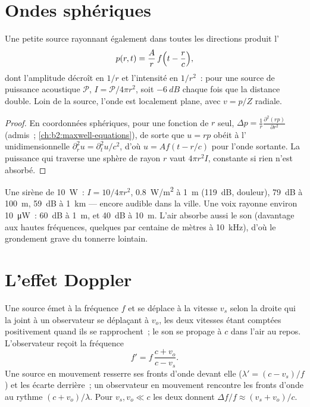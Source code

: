 \section{Ondes sphériques}

\begin{proposition}\label{prop:b2:sound-waves:spherical}
Une petite source rayonnant également dans toutes les directions produit
l'
\[
p(r, t) = \frac{A}{r}\,f\Bigl(t - \frac rc\Bigr) ,
\]
dont l'amplitude décroît en $1/r$ et l'intensité en $1/r^2$~:
pour une source de puissance acoustique $\mathcal P$, $I = \mathcal P/4\pi r^2$, soit
$-\qty{6}{dB}$ chaque fois que la distance double. Loin de la source, l'onde
est localement plane, avec $v = p/Z$ radiale.
\end{proposition}

\begin{proof}
En coordonnées sphériques, pour une fonction de $r$ seul, $\Delta p =
\frac1r\frac{\partial^2(rp)}{\partial r^2}$ (admis~; \cref{ch:b2:maxwell-equations}),
de sorte que $u = rp$ obéit à l' unidimensionnelle $\partial_r^2u = \partial_t^2u/c^2$,
d'où $u = Af(t - r/c)$ pour l'onde sortante. La puissance qui traverse une
sphère de rayon $r$ vaut $4\pi r^2I$, constante si rien n'est absorbé.
\end{proof}

\begin{example}\label{ex:b2:sound-waves:siren}
Une sirène de \qty{10}{W}~: $I = 10/4\pi r^2$, \qty{0.8}{W/m^2} à \qty{1}{m} (\qty{119}{dB},
douleur), \qty{79}{dB} à \qty{100}{m}, \qty{59}{dB} à \qty{1}{km} --- encore audible dans
la ville. Une voix rayonne environ \qty{10}{\micro W}~: \qty{60}{dB} à \qty{1}{m},
et \qty{40}{dB} à \qty{10}{m}. L'air absorbe aussi le son (davantage aux hautes
fréquences, quelques  par centaine de mètres à \qty{10}{kHz}), d'où le
grondement grave du tonnerre lointain.
\end{example}

\section{L'effet Doppler}

\begin{theorem}\label{thm:b2:sound-waves:doppler}
Une source émet à la fréquence $f$ et se déplace à la vitesse $v_s$ selon la droite
qui la joint à un observateur se déplaçant à $v_o$, les deux vitesses étant comptées
positivement quand ils se rapprochent~; le son se propage à $c$ dans
l'air au repos. L'observateur reçoit la fréquence
\[
f' = f\,\frac{c + v_o}{c - v_s} .
\]
Une source en mouvement resserre ses fronts d'onde devant elle ($\lambda' = (c - v_s)/f$)
et les écarte derrière~; un observateur en mouvement rencontre les fronts d'onde au
rythme $(c + v_o)/\lambda$. Pour $v_s, v_o \ll c$ les deux donnent $\Delta f/f \approx
(v_s + v_o)/c$.
\end{theorem}

